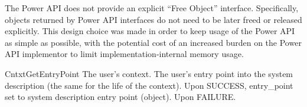 The Power API does not provide an explicit ``Free Object'' interface.
Specifically, objects returned by Power API interfaces do not need to be later freed or released explicitly.
This design choice was made in order to keep usage of the Power API as simple as possible, with the potential cost of an increased burden on the Power API implementor to limit implementation-internal memory usage.


\begin{prototype}{CntxtGetEntryPoint}
	   {\pInput} 	{The user's context.}
		{The user's entry point into the system description (the same for the life of the context).}
	 			{ Upon SUCCESS, entry_point set to system description entry point (object).}	
	 			{ Upon FAILURE.}
\end{prototype}

